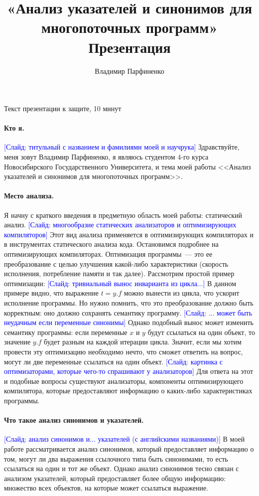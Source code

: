 \documentclass[12pt]{article}
\title{
  «Анализ указателей и синонимов для многопоточных программ»\\
  Презентация
}
\author{
  Владимир Парфиненко
}
\newcommand{\slide}[1]{\textcolor{Blue}{[Слайд: #1]}}
\begin{document}
  {\Large Текст презентации к защите, 10 минут}
  \vspace{5mm}

  \paragraph{Кто я.}
  \slide{титульный с названием и фамилиями моей и научрука}
  Здравствуйте, меня зовут Владимир Парфиненко, я являюсь студентом 4-го
  курса Новосибирского Государственного Университета, и тема моей работы
  <<Анализ указателей и синонимов для многопоточных программ>>.

  \paragraph{Место анализа.}
  Я начну с краткого введения в предметную область моей работы: статический
  анализ.
  \slide{многообразие статических анализаторов и оптимизирующих компиляторов}
  Этот вид анализа применяется в оптимизирующих компиляторах и в инструментах
  статического анализа кода.  Остановимся подробнее на оптимизирующих
  компиляторах.
  Оптимизация программы~--- это ее преобразование с целью улучшения какой-либо
  характеристики (скорость исполнения, потребление памяти и так далее).
  Рассмотрим простой пример оптимизации:
  \slide{тривиальный вынос инварианта из цикла...}
  В данном примере видно, что выражение $t = y.f$ можно вынести из цикла,
  что ускорит исполнение программы. Но нужно помнить, что это преобразование
  должно быть корректным: оно должно сохранять семантику программу.
  \slide{... может быть неудачным если переменные синонимы}
  Однако подобный вынос может изменить семантику программы: если переменные $x$
  и $y$ будут ссылаться на один объект, то значение $y.f$ будет разным на
  каждой итерации цикла. Значит, если мы хотим провести эту оптимизацию
  необходимо нечто, что сможет ответить на вопрос, могут ли две переменные
  ссылаться на один объект.
  \slide{картинка с оптимизаторами, которые чего-то спрашивают у анализаторов}
  Для ответа на этот и подобные вопросы существуют
  анализаторы, компоненты оптимизирующего компилятора, которые предоставляют
  информацию о каких-либо характеристиках программы.

  \paragraph{Что такое анализ синонимов и указателей.}
  \slide{анализ синонимов и... указателей (с английскими названиями)}
  В моей работе рассматривается анализ синонимов, который предоставляет
  информацию о том, могут ли два выражения ссылочного типа быть синонимами, то
  есть ссылаться на один и тот же объект. Однако анализ синонимов тесно связан
  с анализом указателей, который предоставляет более общую информацию:
  множество всех объектов, на которые может ссылаться выражение.
\end{document}
